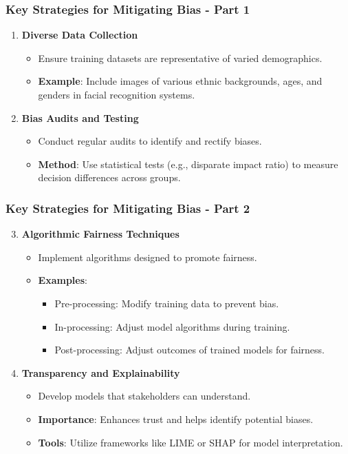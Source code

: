 \documentclass[aspectratio=169]{beamer}
\begin{document}
\begin{frame}[fragile]
    \frametitle{Key Strategies for Mitigating Bias - Part 1}
    \begin{enumerate}
        \item \textbf{Diverse Data Collection}
        \begin{itemize}
            \item Ensure training datasets are representative of varied demographics.
            \item \textbf{Example}: Include images of various ethnic backgrounds, ages, and genders in facial recognition systems.
        \end{itemize}

        \item \textbf{Bias Audits and Testing}
        \begin{itemize}
            \item Conduct regular audits to identify and rectify biases.
            \item \textbf{Method}: Use statistical tests (e.g., disparate impact ratio) to measure decision differences across groups.
        \end{itemize}
    \end{enumerate}
\end{frame}

\begin{frame}[fragile]
    \frametitle{Key Strategies for Mitigating Bias - Part 2}
    \begin{enumerate}
        \setcounter{enumi}{2} %
        \item \textbf{Algorithmic Fairness Techniques}
        \begin{itemize}
            \item Implement algorithms designed to promote fairness.
            \item \textbf{Examples}:
            \begin{itemize}
                \item Pre-processing: Modify training data to prevent bias.
                \item In-processing: Adjust model algorithms during training.
                \item Post-processing: Adjust outcomes of trained models for fairness.
            \end{itemize}
        \end{itemize}
        
        \item \textbf{Transparency and Explainability}
        \begin{itemize}
            \item Develop models that stakeholders can understand.
            \item \textbf{Importance}: Enhances trust and helps identify potential biases.
            \item \textbf{Tools}: Utilize frameworks like LIME or SHAP for model interpretation.
        \end{itemize}
    \end{enumerate}
\end{frame}
\end{document}
